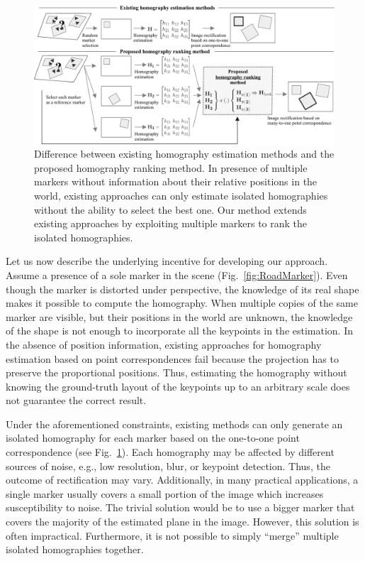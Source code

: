 \begin{figure}[t]
    \centerline{\includegraphics[width=\linewidth]{figures/methodology/homography_motivation_diagram.pdf}}
    \caption[Homography ranking motivation diagram]{Difference between existing homography estimation methods and the proposed homography ranking method. In presence of multiple markers without information about their relative positions in the world, existing approaches can only estimate isolated homographies without the ability to select the best one. Our method extends existing approaches by exploiting multiple markers to rank the isolated homographies.}
    \label{fig:HomographyMotivationDiagram}
\end{figure}

Let us now describe the underlying incentive for developing our approach. Assume a presence of a sole marker in the scene (Fig.~\ref{fig:RoadMarker}). Even though the marker is distorted under perspective, the knowledge of its real shape makes it possible to compute the homography. When multiple copies of the same marker are visible, but their positions in the world are unknown, the knowledge of the shape is not enough to incorporate all the keypoints in the estimation. In the absence of position information, existing approaches for homography estimation based on point correspondences fail because the projection has to preserve the proportional positions. Thus, estimating the homography without knowing the ground-truth layout of the keypoints up to an arbitrary scale does not guarantee the correct result.

Under the aforementioned constraints, existing methods can only generate an isolated homography for each marker based on the one-to-one point correspondence (see Fig.~\ref{fig:HomographyMotivationDiagram}). Each homography may be affected by different sources of noise, e.g., low resolution, blur, or keypoint detection. Thus, the outcome of rectification may vary. Additionally, in many practical applications, a single marker usually covers a small portion of the image which increases susceptibility to noise. The trivial solution would be to use a bigger marker that covers the majority of the estimated plane in the image. However, this solution is often impractical. Furthermore, it is not possible to simply ``merge'' multiple isolated homographies together.

